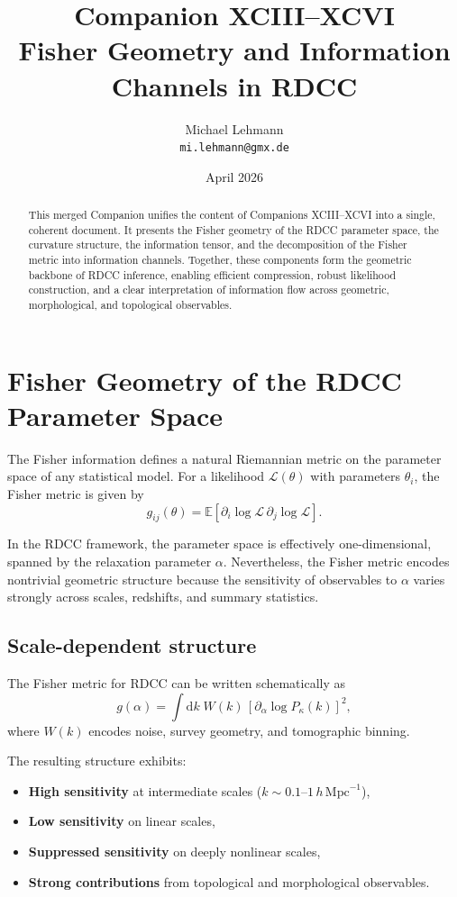 \documentclass[11pt,a4paper]{article}
\title{\textbf{Companion XCIII--XCVI \\ Fisher Geometry and Information Channels in RDCC}}
\author{Michael Lehmann \\ \texttt{mi.lehmann@gmx.de}}
\date{April 2026}
\begin{document}
\maketitle

\begin{abstract}
This merged Companion unifies the content of Companions XCIII--XCVI into a 
single, coherent document. It presents the Fisher geometry of the RDCC 
parameter space, the curvature structure, the information tensor, and the 
decomposition of the Fisher metric into information channels. Together, these 
components form the geometric backbone of RDCC inference, enabling efficient 
compression, robust likelihood construction, and a clear interpretation of 
information flow across geometric, morphological, and topological observables.
\end{abstract}
\section{Fisher Geometry of the RDCC Parameter Space}

The Fisher information defines a natural Riemannian metric on the parameter 
space of any statistical model. For a likelihood $\mathcal{L}(\theta)$ with 
parameters $\theta_i$, the Fisher metric is given by
\begin{equation}
g_{ij}(\theta)
=
\mathbb{E}\!\left[
    \partial_i \log \mathcal{L} \,
    \partial_j \log \mathcal{L}
\right].
\end{equation}

In the RDCC framework, the parameter space is effectively one-dimensional, 
spanned by the relaxation parameter $\alpha$. Nevertheless, the Fisher metric 
encodes nontrivial geometric structure because the sensitivity of observables 
to $\alpha$ varies strongly across scales, redshifts, and summary statistics.

\subsection{Scale-dependent structure}

The Fisher metric for RDCC can be written schematically as
\begin{equation}
g(\alpha)
=
\int \mathrm{d}k \;
W(k) \,
\left[
    \partial_\alpha \log P_{\kappa}(k)
\right]^2,
\end{equation}
where $W(k)$ encodes noise, survey geometry, and tomographic binning.

The resulting structure exhibits:
\begin{itemize}
    \item \textbf{High sensitivity} at intermediate scales 
    ($k \sim 0.1$--$1\,h\,\mathrm{Mpc}^{-1}$),
    \item \textbf{Low sensitivity} on linear scales,
    \item \textbf{Suppressed sensitivity} on deeply nonlinear scales,
    \item \textbf{Strong contributions} from topological and morphological 
    observables.
\end{itemize}
\end{document}
